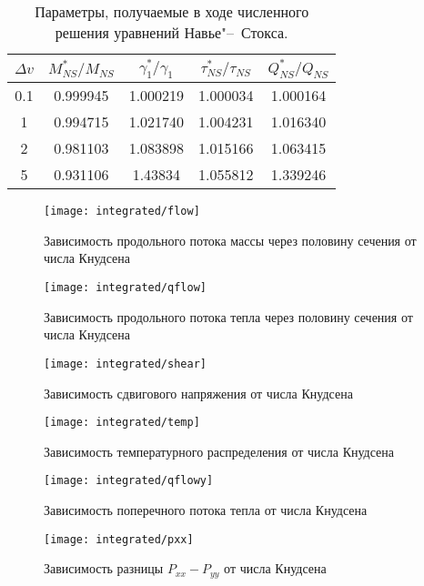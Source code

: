 \documentclass[a4paper,12pt]{article}
\newcommand{\NS}{N\!S}
\begin{document}
\begin{table}
    \centering
    \begin{tabular}{|c|c|c|c|c|}
        \hline
        \(\Delta{v}\) & \(M_{\NS}^*/M_{\NS}\) & \(\gamma_1^*/\gamma_1\) &
            \(\tau_{\NS}^*/\tau_{\NS}\) & \(Q_{\NS}^*/Q_{\NS}\) \\ \hline
        0.1 & 0.999945 & 1.000219 & 1.000034 & 1.000164 \\ \hline
          1 & 0.994715 & 1.021740 & 1.004231 & 1.016340 \\ \hline
          2 & 0.981103 & 1.083898 & 1.015166 & 1.063415 \\ \hline
          5 & 0.931106 & 1.43834  & 1.055812 & 1.339246 \\ \hline
    \end{tabular}
    \caption{Параметры, получаемые в ходе численного решения уравнений Навье"--~Стокса.}
    \label{table:NS_params}
\end{table}

\begin{figure}
    \centering
    \texttt{[image: integrated/flow]}
    \caption{Зависимость продольного потока массы через половину сечения от числа Кнудсена}
    \label{fig:flow}
\end{figure}

\begin{figure}
    \centering
    \texttt{[image: integrated/qflow]}
    \caption{Зависимость продольного потока тепла через половину сечения от числа Кнудсена}
    \label{fig:qflow}
\end{figure}

\begin{figure}
    \centering
    \texttt{[image: integrated/shear]}
    \caption{Зависимость сдвигового напряжения от числа Кнудсена}
    \label{fig:shear}
\end{figure}

\begin{figure}
    \centering
    \texttt{[image: integrated/temp]}
    \caption{Зависимость температурного распределения от числа Кнудсена}
    \label{fig:temp}
\end{figure}

\begin{figure}
    \centering
    \texttt{[image: integrated/qflowy]}
    \caption{Зависимость поперечного потока тепла от числа Кнудсена}
    \label{fig:qflowy}
\end{figure}

\begin{figure}
    \centering
    \texttt{[image: integrated/pxx]}
    \caption{Зависимость разницы \(P_{xx}-P_{yy}\)  от числа Кнудсена}
    \label{fig:pxx}
\end{figure}
\end{document}
